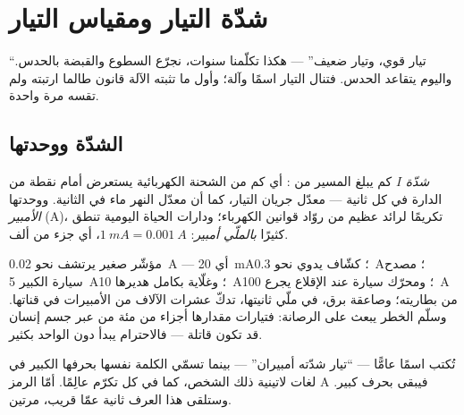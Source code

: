 \chapter{شدّة التيار ومقياس التيار}\label{ch:g8:intensity-ammeter}

``تيار قوي، وتيار ضعيف'' --- هكذا تكلّمنا سنوات، نجرّع السطوع
والقبضة بالحدس. واليوم يتقاعد الحدس. فتنال  التيار اسمًا
 وآلة؛ وأول ما تثبته الآلة قانون طالما ارتبته ولم تقسه
مرة واحدة.

\section{الشدّة ووحدتها}

\begin{definition}[الشدّة]\label{def:g8:intensity-ammeter:intensity}
\emph{شدّة}  $I$  كم يبلغ
المسير من : أي كم من الشحنة الكهربائية يستعرض أمام نقطة من
الدارة في كل ثانية --- معدّل جريان التيار، كما أن معدّل النهر
ماء في الثانية. ووحدتها \emph{الأمبير} (\unit{A})،
تكريمًا لرائد عظيم من روّاد قوانين الكهرباء؛ ودارات الحياة
اليومية تنطق كثيرًا \emph{بالملّي أمبير}: $\qty{1}{mA} =
\qty{0.001}{A}$، أي جزء من ألف.
\end{definition}

\begin{example}\label{ex:g8:intensity-ammeter:values}
 مؤشّر صغير يرتشف نحو \qty{0.02}{A} --- أي \qty{20}{mA}؛
 كشّاف يدوي نحو \qty{0.3}{A}؛  مصدح سيارة الكبير
\qty{5}{A}؛ وغلّاية بكامل هديرها \qty{10}{A}؛ ومحرّك سيارة عند
الإقلاع يجرع \qty{100}{A} من بطاريته؛ وصاعقة برق، في ملّي
ثانيتها، تدكّ عشرات الآلاف من الأمبيرات في قناتها. وسلّم الخطر
يبعث على الرصانة: فتيارات مقدارها أجزاء من مئة من  عبر
جسم إنسان قد تكون قاتلة --- فالاحترام يبدأ دون  الواحد
بكثير.
\end{example}

\begin{remark}\label{rem:g8:intensity-ammeter:person}
تُكتب  اسمًا عامًّا --- ``تيار شدّته أمبيران'' --- بينما
تسمّي الكلمة نفسها بحرفها الكبير في لغات لاتينية ذلك الشخص، كما
في كل  تكرّم عالِمًا. أمّا الرمز \unit{A} فيبقى بحرف كبير.
وستلقى هذا العرف ثانية عمّا قريب، مرتين.
\end{remark}

